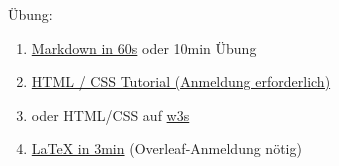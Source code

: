 \begin{frame}[standout]
  Übung: 
  \begin{enumerate}\small
      \item \alert{\href{https://commonmark.org/help}{Markdown in 60s}} oder 10min Übung
      \item \alert{\href{https://dash.generalassemb.ly/}{HTML / CSS Tutorial (Anmeldung erforderlich)}}
      \item oder HTML/CSS auf \href{https://www.w3schools.com/html/default.asp}{w3s}
      \item \alert{\href{https://latex-ninja.com/2018/12/11/jumpstarting-learn-latex-in-3-minutes/}{\LaTeX{} in 3min} (Overleaf-Anmeldung nötig)}
  \end{enumerate}
\end{frame}




